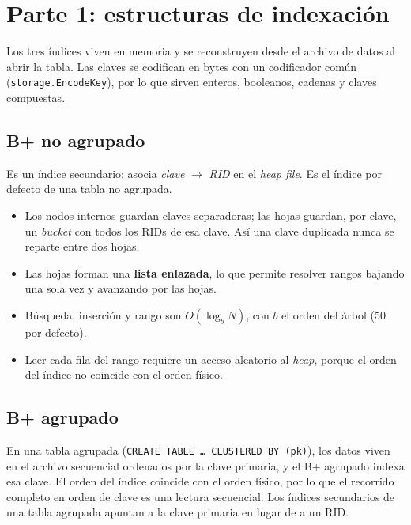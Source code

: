 \documentclass[11pt,a4paper]{article}
\begin{document}
\section{Parte 1: estructuras de indexación}

Los tres índices viven en memoria y se reconstruyen desde el archivo de datos al abrir la tabla. Las claves se codifican en bytes con un codificador común (\texttt{storage.EncodeKey}), por lo que sirven enteros, booleanos, cadenas y claves compuestas.

\subsection{B+ no agrupado}

Es un índice secundario: asocia \emph{clave} $\to$ \emph{RID} en el \emph{heap file}. Es el índice por defecto de una tabla no agrupada.

\begin{itemize}
  \item Los nodos internos guardan claves separadoras; las hojas guardan, por clave, un \emph{bucket} con todos los RIDs de esa clave. Así una clave duplicada nunca se reparte entre dos hojas.
  \item Las hojas forman una \textbf{lista enlazada}, lo que permite resolver rangos bajando una sola vez y avanzando por las hojas.
  \item Búsqueda, inserción y rango son $O(\log_b N)$, con $b$ el orden del árbol (50 por defecto).
  \item Leer cada fila del rango requiere un acceso aleatorio al \emph{heap}, porque el orden del índice no coincide con el orden físico.
\end{itemize}

\subsection{B+ agrupado}

En una tabla agrupada (\texttt{CREATE TABLE \dots\ CLUSTERED BY (pk)}), los datos viven en el archivo secuencial ordenados por la clave primaria, y el B+ agrupado indexa esa clave. El orden del índice coincide con el orden físico, por lo que el recorrido completo en orden de clave es una lectura secuencial. Los índices secundarios de una tabla agrupada apuntan a la clave primaria en lugar de a un RID.
\end{document}

